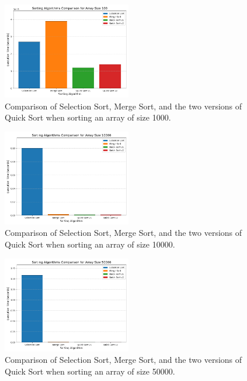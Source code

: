 \documentclass[12pt, letterpaper]{report}
\begin{document}
\begin{figure}[htbp]
    \centering
    \includegraphics[width=0.5\textwidth]{"../img/b_Figure_5.png"}
    \caption{Comparison of Selection Sort, Merge Sort, and the two versions of Quick Sort when sorting an array of size 1000.}
    \label{fig:image5}
\end{figure}

\begin{figure}[htbp]
    \centering
    \includegraphics[width=0.5\textwidth]{"../img/b_Figure_6.png"}
    \caption{Comparison of Selection Sort, Merge Sort, and the two versions of Quick Sort when sorting an array of size 10000.}
    \label{fig:image6}
\end{figure}

\begin{figure}[htbp]
    \centering
    \includegraphics[width=0.5\textwidth]{"../img/b_Figure_7.png"}
    \caption{Comparison of Selection Sort, Merge Sort, and the two versions of Quick Sort when sorting an array of size 50000.}
    \label{fig:image7}
\end{figure}
\end{document}
